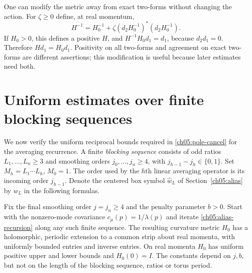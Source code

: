 One can modify the metric away from exact two-forms without changing
the action. For $\zeta\ge0$ define, at real momentum,
\begin{equation}
 H^{-1}=H_0^{-1}
       +\zeta(d_2H_0^{-1})^*(d_2H_0^{-1}).
 \label{ch05:metric-modification}
\end{equation}
If $H_0>0$, this defines a positive $H$, and
$H^{-1}H_0d_1=d_1$, because $d_2d_1=0$. Therefore
$Hd_1=H_0d_1$. Positivity on all two-forms and agreement on exact
two-forms are different assertions; this modification is useful
because later estimates need both.

\section{Uniform estimates over finite blocking sequences}
\label{ch05:histories}

We now verify the uniform reciprocal bounds required in
\eqref{ch05:pole-cancel} for the averaging recurrence.
A finite \emph{blocking sequence} consists of odd ratios $L_1,\ldots,L_n\ge3$ and
smoothing orders $j_0,\ldots,j_n\ge4$, with
$j_{h-1}-j_h\in\{0,1\}$. Set $M_h=L_1\cdots L_h$, $M_0=1$.
The order used by the $h$th linear averaging operator is its incoming order
$j_{h-1}$. Denote the centered box symbol $\widehat w_L$ of
Section~\ref{ch05:alias} by $w_L$ in the following formulas.

\begin{proposition}
\label{ch05:history-prop}
Fix the final smoothing order $j=j_n\ge4$ and the penalty parameter $b>0$.
Start with the nonzero-mode covariance $c_\mu(p)=1/\lambda(p)$
and iterate \eqref{ch05:alias-recursion} along any such finite
sequence. The resulting curvature metric $H_0$ has a holomorphic,
periodic extension to a common strip about real momenta, with
uniformly bounded entries and inverse entries. On real momenta
$H_0$ has uniform positive upper and lower bounds and $H_0(0)=I$.
The constants depend on $j,b$, but not on the length of the blocking sequence,
ratios or torus period.
\end{proposition}

